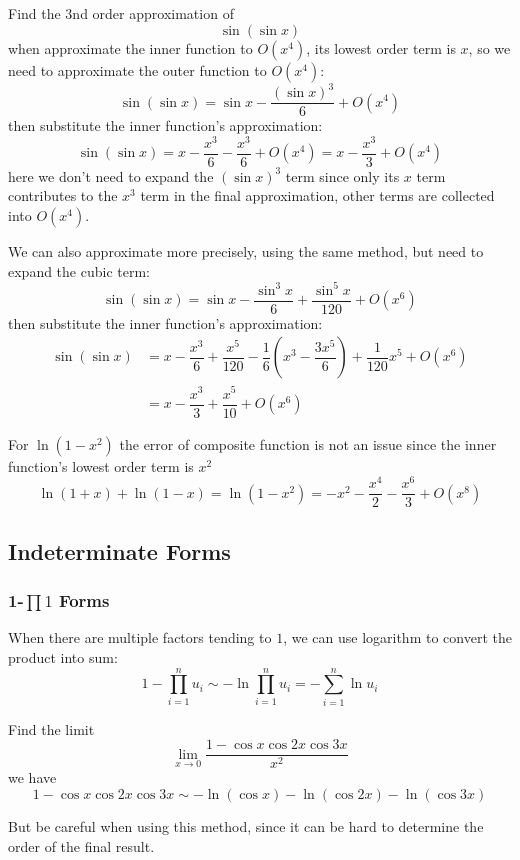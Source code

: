 \documentclass{overview}
\begin{document}
\begin{example}
	Find the 3nd order approximation of
	\[
	\sin(\sin x)
	\] 
	when approximate the inner function to $O(x^4)$, its lowest order term is $x$,
	so we need to approximate the outer function to $O(x^4)$:
	\[
		\sin(\sin x) = \sin x - \dfrac{(\sin x)^3}{6} + O(x^4)
	\]
	then substitute the inner function's approximation:
	\[
		\sin(\sin x) = x - \dfrac{x^3}{6} - \dfrac{x^3}{6} + O(x^4) = x - \dfrac{x^3}{3} + O(x^4)
	\]
	here we don't need to expand the $(\sin x)^3$ term since only its $x$ term
	contributes to the $x^3$ term in the final approximation, other terms are collected
	into $O(x^4)$.
\end{example}
\begin{example}
	We can also approximate more precisely, using the same method, but need to expand
	the cubic term:
	\[
		\sin(\sin x) = \sin x - \dfrac{\sin^3 x}{6} + \dfrac{\sin^5 x}{120} + O(x^6)
	\] 
	then substitute the inner function's approximation:
	\[
		\begin{aligned}
			\sin(\sin x) &= x - \dfrac{x^3}{6} + \dfrac{x^5}{120}
			- \dfrac{1}{6}\left(x^{3} - \dfrac{3x^5}{6}\right) + \dfrac{1}{120}x^{5} + O(x^6) \\
									 &= x - \dfrac{x^3}{3} + \dfrac{x^5}{10} + O(x^6)
		\end{aligned}
	\]
\end{example}
\begin{example}
For $\ln(1-x^2)$ the error of composite function is not an issue since the inner
function's lowest order term is $x^2$
\[
	\ln(1+x)+\ln(1-x) = \ln(1-x^2) = - x^2 - \dfrac{x^4}{2} - \dfrac{x^6}{3} + O(x^8)
\] 
\end{example}

\subsection{Indeterminate Forms}
\subsubsection{1-$\prod 1$ Forms}
When there are multiple factors tending to $1$, we can use logarithm to convert
the product into sum:
\[
	1-\prod_{i=1}^n u_i \sim -\ln \prod_{i=1}^n u_i = -\sum_{i=1}^n \ln u_i
\]
 \begin{example}
	 Find the limit
	 \[
		 \lim_{x \to 0} \frac{1-\cos x \cos 2x \cos 3x}{x^2}
	 \]
	 we have
	 \[
		 1 - \cos x \cos 2x \cos 3x \sim -\ln(\cos x) - \ln(\cos 2x) - \ln(\cos 3x)
	 \]
	\end{example}
	But be careful when using this method, since it can be hard to determine
the order of the final result.
\end{document}

